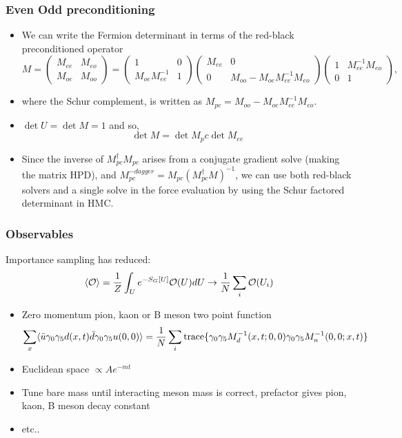 \documentclass[pdf,ps,8pt]{beamer}
\begin{document}
\begin{frame}[fragile]\small\frametitle{Even Odd preconditioning}
\begin{itemize}
\item We can write the Fermion determinant in terms of the red-black preconditioned operator
$$
M = \left(
\begin{array}{cc}
M_{ee} & M_{eo} \\
M_{oe} & M_{oo}
\end{array}
\right)
= 
\left(
\begin{array}{cc}
1  &  0 \\
M_{oe} M_{ee}^{-1}  & 1
\end{array}
\right)
\left(
\begin{array}{cc}
M_{ee} & 0\\
0 & M_{oo} - M_{oe}M_{ee}^{-1} M_{eo}
\end{array}
\right)
\left(
\begin{array}{cc}
1 &  M_{ee}^{-1}M_{eo}\\
0  & 1
\end{array}
\right),
$$
\item where the Schur complement, is written as $M_{pc} = M_{oo} - M_{oe}M_{ee}^{-1} M_{eo}$.
\item $\det U = \det M = 1$ and so,
$$
\det M = \det M_pc \det M_{ee}
$$
\item Since the inverse of $M_{pc}^\dagger M_{pc}$ arises from a conjugate gradient solve (making the matrix HPD), 
and $M_{pc}^{-dagger} = M_{pc} (M_{pc}^\dagger M)^{-1}$, we can use both red-black solvers and a single solve 
in the force evaluation by using the Schur factored determinant in HMC.
\end{itemize}
\end{frame}

\begin{frame}[fragile]\small\frametitle{Observables}

Importance sampling has reduced:
$$
\langle {\cal O} \rangle = \frac{1}{Z} \int_U e^{-S_G[U]} {\cal O}(U) dU  \to \frac{1}{N} \sum\limits_i {\cal O}(U_i) 
$$
\begin{itemize}
\item Zero momentum pion, kaon or B meson two point function
  $$
  \sum\limits_x \langle \bar u \gamma_0 \gamma_5 d (x,t) \bar d \gamma_0 \gamma_5 u (0,0) \rangle
    = \frac{1}{N}\sum_i  {\rm trace}  \{ \gamma_0 \gamma_5 M^{-1}_d(x,t;0,0)\gamma_0 \gamma_5 M^{-1}_u(0,0;x,t) \}
    $$
\item Euclidean space $\propto A e^{- m t} $
\item Tune bare mass until interacting meson mass is correct, prefactor gives pion, kaon, B meson decay constant
\item etc.. 
\end{itemize}
  
\end{frame}
\end{document}
